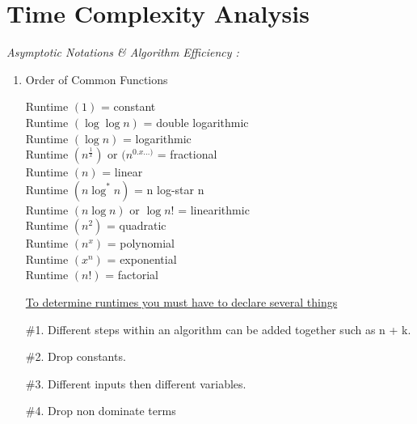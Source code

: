 \documentclass[10pt,letterpaper]{article}
\begin{document}
{
\newpage{}
\section*{Time Complexity Analysis}
\emph{Asymptotic Notations \& Algorithm Efficiency :}
\begin{enumerate}
	\item[]
	\begin {center}Order of Common Functions\end{center}
    \vspace{.8em}
    {
            Runtime $(1)$ = constant\\
            Runtime $(\log\log n)$ = double logarithmic\\
            Runtime $(\log n)$ = logarithmic \\
            Runtime $(n^{\frac{1}{x}})$ or $ (n^{0.x\dotsc)} $ = fractional\\
            Runtime $(n)$ = linear\\
            Runtime $(n \log^{*} n)$ = n log-star n \\
            Runtime $(n\log n)$ or $\log n!$ = linearithmic\\
            Runtime $(n^{2})$ = quadratic\\
            Runtime $(n^{x})$ = polynomial\\
            Runtime $(x^{n})$ = exponential\\
            Runtime $(n!)$ = factorial \\
    }
    \begin{center}\underline{To determine runtimes you must have to declare several things}\end{center}
    \#1. Different steps within an algorithm can be added together such as n + k. 
    
    \#2. Drop constants. 
    
    \#3. Different inputs then different variables.
    
    \#4. Drop non dominate terms
    \vspace{1.0em}
    


\end{enumerate}}
\end{document}
